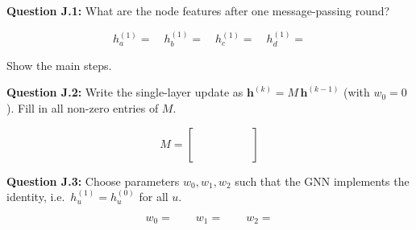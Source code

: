 \documentclass[12pt,a4paper]{article}
\begin{document}
\textbf{Question J.1:} What are the node features after one message-passing round?

\[
  h_a^{(1)} = \quad h_b^{(1)} = \quad h_c^{(1)} = \quad h_d^{(1)} =
\]

Show the main steps.

\vspace{3cm}

\textbf{Question J.2:} Write the single-layer update as $\mathbf{h}^{(k)} = M\,\mathbf{h}^{(k-1)}$
(with $w_0=0$).  Fill in all non-zero entries of $M$.

\[
  M = \begin{bmatrix}
    \phantom{0} & \phantom{0} & \phantom{0} & \phantom{0} \\[6pt]
    & & & \\[6pt]
    & & & \\[6pt]
    & & &
  \end{bmatrix}
\]

\textbf{Question J.3:} Choose parameters $w_0, w_1, w_2$ such that the GNN implements the
identity, i.e.\ $h_u^{(1)}=h_u^{(0)}$ for all $u$.

\[
  w_0 = \qquad w_1 = \qquad w_2 =
\]
\end{document}
